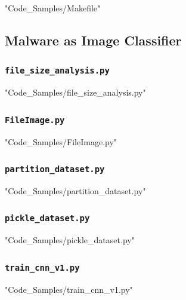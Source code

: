 \documentclass[12pt, letterpaper, titlepage]{article}
\begin{document}

{"Code_Samples/Makefile"}

\subsection{Malware as Image Classifier}

\cprotect\subsubsection{\verb|file_size_analysis.py|}


{"Code_Samples/file_size_analysis.py"}
\cprotect\subsubsection{\verb|FileImage.py|}


{"Code_Samples/FileImage.py"}

\cprotect\subsubsection{\verb|partition_dataset.py|}


{"Code_Samples/partition_dataset.py"}

\cprotect\subsubsection{\verb|pickle_dataset.py|}


{"Code_Samples/pickle_dataset.py"}

\cprotect\subsubsection{\verb|train_cnn_v1.py|}


{"Code_Samples/train_cnn_v1.py"}
\end{document}
